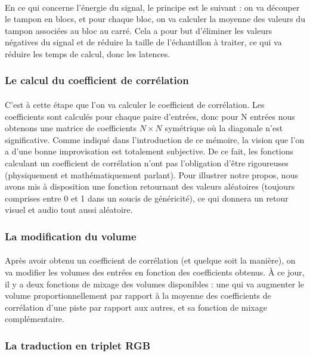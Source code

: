 \paragraph{}
En ce qui concerne l'énergie du signal, le principe est le suivant : on va découper le tampon en blocs, et pour chaque bloc, on va calculer la moyenne des valeurs du tampon associées au bloc au carré. Cela a pour but d'éliminer les valeurs négatives du signal et de réduire la taille de l'échantillon à traiter,
ce qui va réduire les temps de calcul, donc les latences.
\subsubsection{Le calcul du coefficient de corrélation}
\paragraph{}
C'est à cette étape que l'on va calculer le coefficient de corrélation. Les coefficients sont calculés pour chaque paire d'entrées, donc pour N entrées nous obtenons une matrice de coefficients $N \times N$ symétrique où la diagonale n'est significative. Comme indiqué dans l'introduction de ce mémoire, la vision que l'on a d'une bonne improvisation est totalement subjective. De ce fait, les fonctions calculant un coefficient de corrélation n'ont pas l'obligation d'être rigoureuses (physiquement et mathématiquement parlant). Pour illustrer notre propos, nous avons mis à disposition une fonction retournant des valeurs aléatoires (toujours comprises entre 0 et 1 dans un soucis de généricité), ce qui donnera un retour visuel et audio tout aussi aléatoire.
\subsubsection{La modification du volume}
\paragraph{}
Après avoir obtenu un coefficient de corrélation (et quelque soit la manière), on va modifier les volumes des entrées en fonction des coefficients obtenus. À ce jour, il y a deux fonctions de mixage des volumes disponibles : une qui va augmenter le volume proportionnellement par rapport à la moyenne des coefficients de corrélation d'une piste par rapport aux autres, et sa fonction de mixage complémentaire.
\subsubsection{La traduction en triplet RGB}
